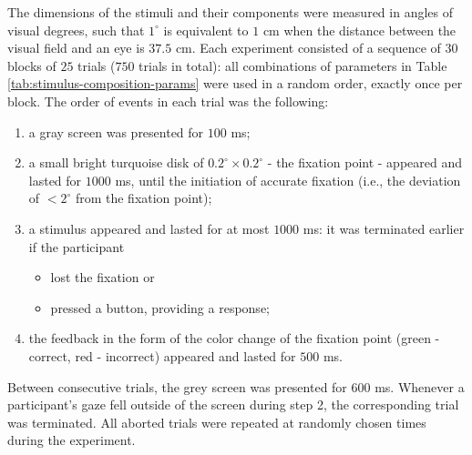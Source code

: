 The dimensions of the stimuli and their components were measured in angles of visual degrees, such that $1^\circ$ is equivalent to $1$ cm when the distance between the visual field and an eye is $37.5$ cm. Each experiment consisted of a sequence of $30$ blocks of $25$ trials ($750$ trials in total): all combinations of parameters in Table \ref{tab:stimulus-composition-params} were used in a random order, exactly once per block. The order of events in each trial was the following:
\begin{enumerate}
    \item a gray screen was presented for $100$ ms;
    
    \item a small bright turquoise disk of $0.2^\circ \times 0.2^\circ$ - the fixation point - appeared and lasted for $1000$ ms, until the initiation of accurate fixation (i.e., the deviation of $< 2^\circ$ from the fixation point); \\ 
    
    \item a stimulus appeared and lasted for at most $1000$ ms: it was terminated earlier if the participant
    \begin{itemize}
        \item lost the fixation or
        \item pressed a button, providing a response;
    \end{itemize}
    
    \item the feedback in the form of the color change of the fixation point (green - correct, red - incorrect) appeared and lasted for $500$ ms.
\end{enumerate}
Between consecutive trials, the grey screen was presented for $600$ ms.  Whenever a participant's gaze fell outside of the screen during step 2, the corresponding trial was terminated. All aborted trials were repeated at randomly chosen times during the experiment.









